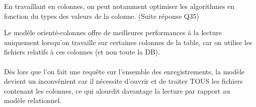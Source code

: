 \item{}
{\vrai}
{
En travaillant en colonnes, on peut notamment optimiser les algorithmes en fonction du types des valeurs de la colonne. (Suite réponse Q35)
}


\item{}
{\faux}
{
Le modèle orienté-colonnes offre de meilleures performances à la lecture uniquement lorsqu'on travaille sur certaines colonnes de la table, car on utilise les fichiers relatifs à ces colonnes (et non toute la DB).
\paragraph{}
Dès lors que l'on fait une requête sur l'ensemble des enregistrements, la modèle devient un inconvénient car il nécessite d'ouvrir et de traiter TOUS les fichiers contenant les colonnes, ce qui alourdit davantage la lecture par rapport au modèle relationnel.
}


